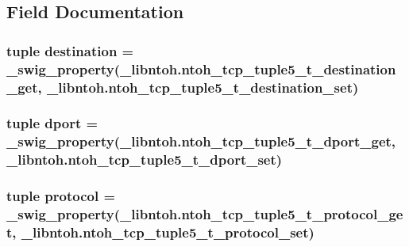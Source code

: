 \subsection{Field Documentation}
\hypertarget{classlibntoh_1_1ntoh__tcp__tuple5__t_adaac82457baf1096d1c38cadf8123ce7}{
\subsubsection[{destination}]{\setlength{\rightskip}{0pt plus 5cm}tuple destination = {\bf \-\_\-swig\-\_\-property}(\-\_\-libntoh.\-ntoh\-\_\-tcp\-\_\-tuple5\-\_\-t\-\_\-destination\-\_\-get, \-\_\-libntoh.\-ntoh\-\_\-tcp\-\_\-tuple5\-\_\-t\-\_\-destination\-\_\-set)\hspace{0.3cm}{\ttfamily [static]}}}\label{classlibntoh_1_1ntoh__tcp__tuple5__t_adaac82457baf1096d1c38cadf8123ce7}
\hypertarget{classlibntoh_1_1ntoh__tcp__tuple5__t_a5f69c896ed006fde20f09b7858fce13e}{
\subsubsection[{dport}]{\setlength{\rightskip}{0pt plus 5cm}tuple dport = {\bf \-\_\-swig\-\_\-property}(\-\_\-libntoh.\-ntoh\-\_\-tcp\-\_\-tuple5\-\_\-t\-\_\-dport\-\_\-get, \-\_\-libntoh.\-ntoh\-\_\-tcp\-\_\-tuple5\-\_\-t\-\_\-dport\-\_\-set)\hspace{0.3cm}{\ttfamily [static]}}}\label{classlibntoh_1_1ntoh__tcp__tuple5__t_a5f69c896ed006fde20f09b7858fce13e}
\hypertarget{classlibntoh_1_1ntoh__tcp__tuple5__t_ae535ff0dd346855882bd298a9e22bbc1}{
\subsubsection[{protocol}]{\setlength{\rightskip}{0pt plus 5cm}tuple protocol = {\bf \-\_\-swig\-\_\-property}(\-\_\-libntoh.\-ntoh\-\_\-tcp\-\_\-tuple5\-\_\-t\-\_\-protocol\-\_\-get, \-\_\-libntoh.\-ntoh\-\_\-tcp\-\_\-tuple5\-\_\-t\-\_\-protocol\-\_\-set)\hspace{0.3cm}{\ttfamily [static]}}}\label{classlibntoh_1_1ntoh__tcp__tuple5__t_ae535ff0dd346855882bd298a9e22bbc1}
